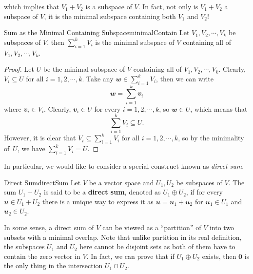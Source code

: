 \documentclass[math]{amznotes}
\theoremstyle{remark}
\newcommand{\zero}{\mathbf{0}}
\begin{document}
which implies that $V_1 + V_2$ is a subspace of $V$. In fact, not only is $V_1 +  V_2$ a subspace of $V$, it is the minimal subspace containing both $V_1$ and $V_2$!
\begin{probox}{Sum as the Minimal Containing Subspace}{minimalContain}
    Let $V_1, V_2, \cdots, V_k$ be subspaces of $V$, then $\sum_{i = 1}^{k}V_i$ is the minimal subspace of $V$ containing all of $V_1, V_2, \cdots, V_k$.
    \tcblower
    \begin{proof}
        Let $U$ be the minimal subspace of $V$ containing all of $V_1, V_2, \cdots, V_k$. Clearly, $V_i \subseteq U$ for all $i = 1, 2, \cdots, k$. Take any $\mathbfit{w} \in \sum_{i = 1}^{k}V_i$, then we can write 
        \begin{equation*}
            \mathbfit{w} = \sum_{i = 1}^{k}\mathbfit{v}_i
        \end{equation*}
        where $\mathbfit{v}_i \in V_i$. Clearly, $\mathbfit{v}_i \in U$ for every $i = 1, 2, \cdots, k$, so $\mathbfit{w} \in U$, which means that 
        \begin{equation*}
            \sum_{i = 1}^{k}V_i \subseteq U.
        \end{equation*}
        However, it is clear that $V_i \subseteq \sum_{i = 1}^{k}V_i$ for all $i = 1, 2, \cdots, k$, so by the minimality of~$U$, we have $\sum_{i = 1}^{k}V_i = U$.
    \end{proof}
\end{probox}
In particular, we would like to consider a special construct known as \textit{direct sum}.
\begin{dfnbox}{Direct Sum}{directSum}
    Let $V$ be a vector space and $U_1, U_2$ be subspaces of $V$. The sum $U_1 + U_2$ is said to be a {\color{red} \textbf{direct sum}}, denoted as $U_1 \oplus U_2$, if for every $\mathbfit{u} \in U_1 + U_2$ there is a unique way to express it as $\mathbfit{u} = \mathbfit{u}_1 + \mathbfit{u}_2$ for $\mathbfit{u}_1 \in U_1$ and $\mathbfit{u}_2 \in U_2$.
\end{dfnbox}
In some sense, a direct sum of $V$ can be viewed as a ``partition'' of $V$ into two subsets with a minimal overlap. Note that unlike partition in its real definition, the subspaces $U_1$ and $U_2$ here cannot be disjoint sets as both of them have to contain the zero vector in $V$. In fact, we can prove that if $U_1 \oplus U_2$ exists, then $\zero$ is the only thing in the intersection $U_1 \cap U_2$.
\end{document}
